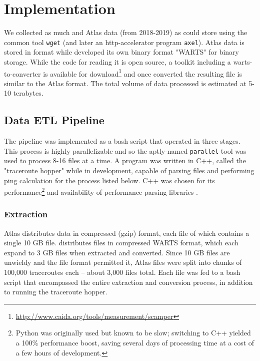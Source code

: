 \section{Implementation}\label{sec:caida_impl}

We collected as much \caida and \ripe Atlas data (from 2018-2019) as could store using the common tool \texttt{wget} (and later an http-accelerator program \texttt{axel}). \ripe Atlas data is stored in \json format while \caida developed its own binary format "WARTS" for binary storage. While the code for reading it is open source, a toolkit including a warts-to-\json converter is available for download\footnote{\url{http://www.caida.org/tools/measurement/scamper}} and once converted the resulting \json file is similar to the \ripe Atlas format. The total volume of data processed is estimated at 5-10 terabytes.

\subsection{Data ETL Pipeline}

The pipeline was implemented as a bash script that operated in three stages. This process is highly parallelizable and so the aptly-named \texttt{parallel} tool \cite{Tange2011} was used to process 8-16 files at a time. A \cli program was written in C++, called the "traceroute hopper" while in development, capable of parsing \json files and performing ping calculation for the \etl process listed below. C++ was chosen for its performance\footnote{Python was originally used but known to be slow; switching to C++ yielded a 100\% performance boost, saving several days of processing time at a cost of a few hours of development.} and availability of performance \json parsing libraries \cite{Tencent2016a}.

\subsubsection{Extraction} \ripe Atlas distributes data in compressed (gzip) format, each file of which contains a single 10 GB \json file. \caida distributes files in compressed WARTS format, which each expand to 3 GB \json files when extracted and converted. Since 10 GB files are unwieldy and the file format permitted it, \ripe Atlas files were split into chunks of 100,000 traceroutes each -- about 3,000 files total. Each file was fed to a bash script that encompassed the entire extraction and conversion process, in addition to running the traceroute hopper.

